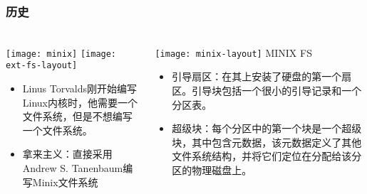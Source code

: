 \begin{frame}[fragile]
	\frametitle{历史}
	
	\frametitle{ }
	\begin{columns}[t]
		\begin{column}{.4\textwidth}
			\texttt{[image: minix]}
			\texttt{[image: ext-fs-layout]}
	
			\begin{itemize}
				\item Linus Torvalds刚开始编写Linux内核时，他需要一个文件系统，但是不想编写一个文件系统。
				\item 拿来主义：直接采用Andrew S. Tanenbaum编写Minix文件系统
			\end{itemize}
		
		\end{column}
		
		\begin{column}{.6\textwidth}			
			\texttt{[image: minix-layout]}
			MINIX FS
				\begin{itemize}
					\item 引导扇区：在其上安装了硬盘的第一个扇区。引导块包括一个很小的引导记录和一个分区表。
					\item 超级块：每个分区中的第一个块是一个超级块，其中包含元数据，该元数据定义了其他文件系统结构，并将它们定位在分配给该分区的物理磁盘上。
				\end{itemize}
			
		\end{column}
	\end{columns}
	
\end{frame}

